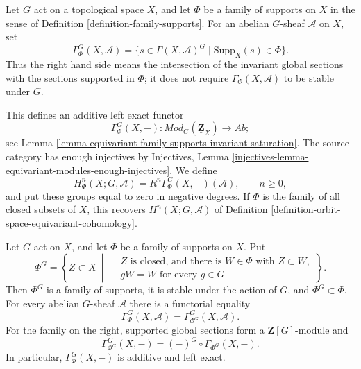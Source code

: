 \begin{definition}
\label{definition-equivariant-cohomology-family-supports}
\begin{reference}
\cite[Chapter V, \S 5.7, p. 219]{Tohoku}
\end{reference}
Let $G$ act on a topological space $X$, and let $\Phi$ be a family of
supports on $X$ in the sense of Definition
\ref{definition-family-supports}. For an abelian $G$-sheaf $\mathcal A$ on
$X$, set
$$
\Gamma^G_\Phi(X,\mathcal A)
=
\{s\in\Gamma(X,\mathcal A)^G\mid
\text{Supp}_X(s)\in\Phi\}.
$$
Thus the right hand side means the intersection of the invariant global
sections with the sections supported in $\Phi$; it does not require
$\Gamma_\Phi(X,\mathcal A)$ to be stable under $G$.

This defines an additive left exact functor
$$
\Gamma^G_\Phi(X,-):
\textit{Mod}_G(\underline{\mathbf Z}_X)
\longrightarrow
\textit{Ab};
$$
see Lemma \ref{lemma-equivariant-family-supports-invariant-saturation}.
The source category has enough injectives by Injectives, Lemma
\ref{injectives-lemma-equivariant-modules-enough-injectives}. We define
$$
H^n_\Phi(X;G,\mathcal A)
=
R^n\Gamma^G_\Phi(X,-)(\mathcal A),
\qquad n\geq 0,
$$
and put these groups equal to zero in negative degrees. If $\Phi$ is the
family of all closed subsets of $X$, this recovers
$H^n(X;G,\mathcal A)$ of Definition
\ref{definition-orbit-space-equivariant-cohomology}.
\end{definition}

\begin{lemma}
\label{lemma-equivariant-family-supports-invariant-saturation}
\begin{reference}
\cite[Chapter V, \S 5.7, p. 219]{Tohoku}
\end{reference}
Let $G$ act on $X$, and let $\Phi$ be a family of supports on $X$. Put
$$
\Phi^G=
\left\{
Z\subset X\ \middle|\
\begin{aligned}
&Z\text{ is closed, and there is }W\in\Phi\text{ with }Z\subset W,\\
&gW=W\text{ for every }g\in G
\end{aligned}
\right\}.
$$
Then $\Phi^G$ is a family of supports, it is stable under the action of
$G$, and $\Phi^G\subset\Phi$. For every abelian $G$-sheaf $\mathcal A$
there is a functorial equality
$$
\Gamma^G_\Phi(X,\mathcal A)
=
\Gamma^G_{\Phi^G}(X,\mathcal A).
$$
For the family on the right, supported global sections form a
$\mathbf Z[G]$-module and
$$
\Gamma^G_{\Phi^G}(X,-)
=
(-)^G\circ\Gamma_{\Phi^G}(X,-).
$$
In particular, $\Gamma^G_\Phi(X,-)$ is additive and left exact.
\end{lemma}


